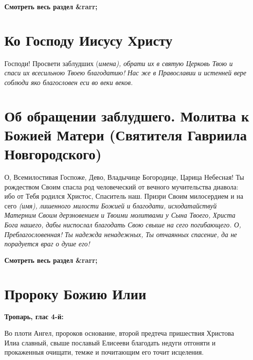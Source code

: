 \bfseries Смотреть весь раздел &rarr;\normalfont{} 

\section{Ко Господу Иисусу Христу}
 


Господи! Просвети заблудших (\itshape имена\normalfont{}), обрати их в святую Церковь Твою и спаси их всесильною Твоею благодатию! Нас же в Православии и истенней вере соблюди яко благословен еси во веки веков.


\section{Об обращении заблудшего.  Молитва к Божией Матери  (Святителя Гавриила Новгородского)}
 

О, Всемилостивая Госпоже, Дево, Владычице Богородице, Царица Небесная! Ты рождеством Своим спасла род человеческий от вечного мучительства диавола: ибо от Тебя родился Христос, Спаситель наш. Призри Своим милосердием и на сего \itshape (имя)\normalfont{}, лишенного милости Божией и благодати, исходатайствуй Матерним Своим дерзновением и Твоими молитвами у Сына Твоего, Христа Бога нашего, дабы ниспослал благодать Свою свыше на сего погибающего. О, Преблагословенная! Ты надежда ненадежных, Ты отчаянных спасение, да не порадуется враг о душе его! 





\mychapterending


\bfseries Смотреть весь раздел &rarr;\normalfont{} 

\section{Пророку Божию Илии}
 

\bfseries Тропарь, глас 4-й:\normalfont{}


Во плоти Ангел, пророков основание, второй предтеча пришествия Христова Илиа славный, свыше пославый Елисееви благодать недуги отгоняти и прокаженныя очищати, темже и почитающим его точит исцеления.


